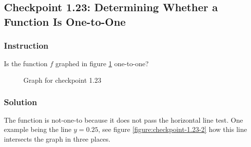 \subsection*{Checkpoint 1.23: Determining Whether a Function Is One-to-One}

\subsubsection*{Instruction}

Is the function $ f $ graphed in figure \ref{figure:checkpoint-1.23-1} one-to-one?

\begin{figure}[H]
  \centering
  \caption{Graph for checkpoint 1.23}
  \label{figure:checkpoint-1.23-1}
\end{figure}

\subsubsection*{Solution}

The function is not-one-to because it does not pass the horizontal line test. One example being the line $ y = 0.25 $, see figure \ref{figure:checkpoint-1.23-2} how this line intersects the graph in three places.

